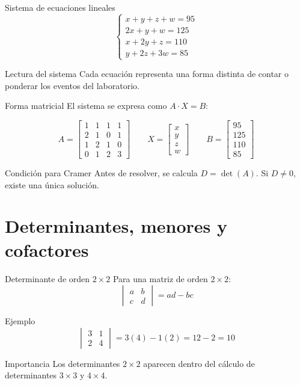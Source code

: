 \documentclass[aspectratio=169]{beamer}
\newcommand{\mat}[1]{\begin{bmatrix}#1\end{bmatrix}}
\newcommand{\detm}[1]{\begin{vmatrix}#1\end{vmatrix}}
\begin{document}
\begin{frame}{Sistema de ecuaciones lineales}
\[
\begin{cases}
x+y+z+w=95 \\
2x+y+w=125 \\
x+2y+z=110 \\
y+2z+3w=85
\end{cases}
\]

\begin{block}{Lectura del sistema}
Cada ecuación representa una forma distinta de contar o ponderar los eventos del laboratorio.
\end{block}
\end{frame}

\begin{frame}{Forma matricial}
El sistema se expresa como $A\cdot X=B$:

\[
A=\mat{
1&1&1&1\\
2&1&0&1\\
1&2&1&0\\
0&1&2&3}
\qquad
X=\mat{x\\y\\z\\w}
\qquad
B=\mat{95\\125\\110\\85}
\]

\begin{alertblock}{Condición para Cramer}
Antes de resolver, se calcula $D=\det(A)$. Si $D\neq0$, existe una única solución.
\end{alertblock}
\end{frame}

\section{Determinantes, menores y cofactores}

\begin{frame}{Determinante de orden $2\times2$}
Para una matriz de orden $2\times2$:
\[
\detm{a&b\\c&d}=ad-bc
\]

\begin{exampleblock}{Ejemplo}
\[
\detm{3&1\\2&4}=3(4)-1(2)=12-2=10
\]
\end{exampleblock}

\begin{block}{Importancia}
Los determinantes $2\times2$ aparecen dentro del cálculo de determinantes $3\times3$ y $4\times4$.
\end{block}
\end{frame}
\end{document}
